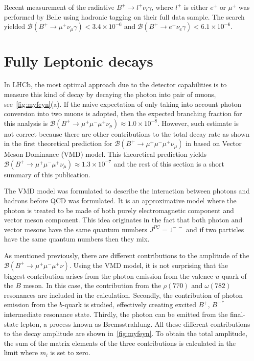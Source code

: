 Recent measurement of the radiative $B^{+} \rightarrow l^{+} \nu_{l} \gamma$, where $l^{+}$ is either $e^{+}$ or $\mu^{+}$ was performed by Belle using hadronic tagging on their full data sample\cite{Heller:2015vvm}. The search yielded $\mathcal{B}(B^{+}\rightarrow \mu^{+} \nu_\mu \gamma) < 3.4\times 10^{-6}$ and $\mathcal{B}(B^{+}\rightarrow e^{+} \nu_e \gamma) < 6.1\times 10^{-6}$.



\section{Fully Leptonic  decays}
\label{mydecay}

In LHCb, the most optimal approach due to the detector capabilities is to measure this kind of decay by decaying the photon into pair of muons, see~\autoref{fig:myfeyn}(a). If the naive expectation of only taking into account photon conversion into two muons is adopted, then the expected branching fraction for this analysis is $\mathcal{B}(B^{+}\rightarrow \mu^{+} \mu^{-} \mu^{+} \nu_{\mu}) \approx 1.0\times 10^{-8}$. However, such estimate is not correct because there are other contributions to the total decay rate as shown in the first theoretical prediction for $\mathcal{B}(B^{+}\rightarrow \mu^{+} \mu^{-} \mu^{+} \nu_{\mu})$ in \cite{Danilina:2018uzr} based on Vector Meson Dominance (VMD) model. This theoretical prediction yields $\mathcal{B}(B^{+} \rightarrow \mu^{+} \mu^{-} \mu^{+} \nu_{\mu}) \approx 1.3\times 10^{-7}$ and the rest of this section is a short summary of this publication.

 The VMD model was formulated to describe the interaction between photons and hadrons before \gls{QCD} was formulated. It is an approximative model where the photon is treated to be made of both purely electromagnetic component and vector meson component. This idea originates in the fact that both photon and vector mesons have the same quantum numbers $J^{PC} = 1^{-\ -}$ and if two particles have the same quantum numbers then they mix. %

As mentioned previously, there are different contributions to the amplitude of the $\mathcal{B}(B^{+}\rightarrow \mu^{+} \mu^{-} \mu^{+} \nu)$. Using the VMD model, it is not surprising that the biggest contribution arises from the photon emission from the valence $u$-quark of the $B$ meson. In this case, the contribution from the $\rho(770)$ and $\omega(782)$ resonances are included in the calculation. Secondly, the contribution of photon emission from the $b$-quark is studied, effectively creating excited $B^{+}$, $B^{+*}$ intermediate resonance state. Thirdly, the photon can be emitted from the final-state lepton, a process known as Bremsstrahlung. All these different contributions to the decay amplitude are shown in~\autoref{fig:myfeyn}. To obtain the total amplitude, the sum of the matrix elements of the three contributions is calculated in the limit where $m_{l}$ is set to zero.


